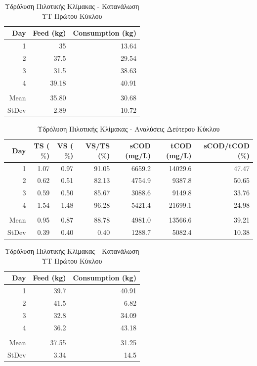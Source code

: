 \documentclass[11pt]{report}
\begin{document}
\begin{table}[htbp]
\caption{\label{tab:orgd4f6fb5}Υδρόλυση Πιλοτικής Κλίμακας - Κατανάλωση ΥΤ Πρώτου Κύκλου}
\centering
\begin{tabular}{rrr}
Day & Feed (kg) & Consumption (kg)\\[0pt]
\hline
1 & 35 & 13.64\\[0pt]
2 & 37.5 & 29.54\\[0pt]
3 & 31.5 & 38.63\\[0pt]
4 & 39.18 & 40.91\\[0pt]
 &  & \\[0pt]
Mean & 35.80 & 30.68\\[0pt]
StDev & 2.89 & 10.72\\[0pt]
\end{tabular}
\end{table}

\begin{table}[htbp]
\caption{\label{tab:org60d6318}Υδρόλυση Πιλοτικής Κλίμακας - Αναλύσεις Δεύτερου Κύκλου}
\centering
\begin{tabular}{rrrrrrr}
Day & TS (\(\%\)) & VS (\(\%\)) & VS/TS (\(\%\)) & sCOD (mg/L) & tCOD (mg/L) & sCOD/tCOD (\(\%\))\\[0pt]
\hline
1 & 1.07 & 0.97 & 91.05 & 6659.2 & 14029.6 & 47.47\\[0pt]
2 & 0.62 & 0.51 & 82.13 & 4754.9 & 9387.8 & 50.65\\[0pt]
3 & 0.59 & 0.50 & 85.67 & 3088.6 & 9149.8 & 33.76\\[0pt]
4 & 1.54 & 1.48 & 96.28 & 5421.4 & 21699.1 & 24.98\\[0pt]
 &  &  &  &  &  & \\[0pt]
Mean & 0.95 & 0.87 & 88.78 & 4981.0 & 13566.6 & 39.21\\[0pt]
StDev & 0.39 & 0.40 & 0.40 & 1288.7 & 5082.4 & 10.38\\[0pt]
\end{tabular}
\end{table}

\pagebreak

\begin{table}[htbp]
\caption{\label{tab:org78d563a}Υδρόλυση Πιλοτικής Κλίμακας - Κατανάλωση ΥΤ Πρώτου Κύκλου}
\centering
\begin{tabular}{rrr}
Day & Feed (kg) & Consumption (kg)\\[0pt]
\hline
1 & 39.7 & 40.91\\[0pt]
2 & 41.5 & 6.82\\[0pt]
3 & 32.8 & 34.09\\[0pt]
4 & 36.2 & 43.18\\[0pt]
 &  & \\[0pt]
Mean & 37.55 & 31.25\\[0pt]
StDev & 3.34 & 14.5\\[0pt]
\end{tabular}
\end{table}
\end{document}
